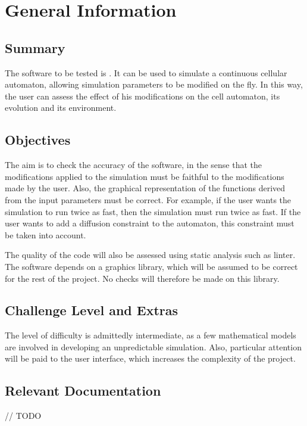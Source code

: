 \documentclass[12pt, titlepage]{article}
\begin{document}
\section{General Information}

\subsection{Summary}

The software to be tested is \progname. It can be used to simulate a continuous cellular automaton, allowing simulation parameters to be modified on the fly. 
In this way, the user can assess the effect of his modifications on the cell automaton, its evolution and its environment.

\subsection{Objectives}

The aim is to check the accuracy of the software, in the sense that the modifications applied to the simulation must be faithful to the modifications made by the user. 
Also, the graphical representation of the functions derived from the input parameters must be correct. 
For example, if the user wants the simulation to run twice as fast, then the simulation must run twice as fast.
If the user wants to add a diffusion constraint to the automaton, this constraint must be taken into account.

The quality of the code will also be assessed using static analysis such as linter.
The software depends on a graphics library, which will be assumed to be correct for the rest of the project. No checks will therefore be made on this library.

\subsection{Challenge Level and Extras}

The level of difficulty is admittedly intermediate, as a few mathematical models are involved in developing an unpredictable simulation.
 Also, particular attention will be paid to the user interface, which increases the complexity of the project.

\subsection{Relevant Documentation}

// TODO 
\end{document}
